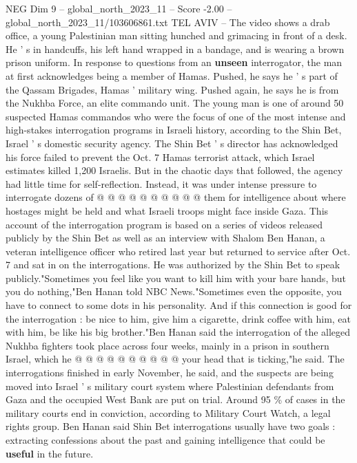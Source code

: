 \begin{textsample}{NEG Dim 9 – global\_north\_2023\_11 – Score -2.00 – global\_north\_2023\_11/103606861.txt}  \label{ex:f9_neg_302}
TEL AVIV -- The video shows a drab office, a young Palestinian man sitting hunched and grimacing in front of a desk.
He ' s in handcuffs, his left hand wrapped in a bandage, and is wearing a brown prison uniform.
In response to questions from an \textbf{unseen} interrogator, the man at first acknowledges being a member of Hamas.
Pushed, he says he ' s part of the Qassam Brigades, Hamas ' military wing.
Pushed again, he says he is from the Nukhba Force, an elite commando unit.
The young man is one of around 50 suspected Hamas commandos who were the focus of one of the most intense and high-stakes interrogation programs in Israeli history, according to the Shin Bet, Israel ' s domestic security agency.
The Shin Bet ' s director has acknowledged his force failed to prevent the Oct. 7 Hamas terrorist attack, which Israel estimates killed 1,200 Israelis.
But in the chaotic days that followed, the agency had little time for self-reflection.
Instead, it was under intense pressure to interrogate dozens of @ @ @ @ @ @ @ @ @ @ them for intelligence about where hostages might be held and what Israeli troops might face inside Gaza.
This account of the interrogation program is based on a series of videos released publicly by the Shin Bet as well as an interview with Shalom Ben Hanan, a veteran intelligence officer who retired last year but returned to service after Oct. 7 and sat in on the interrogations.
He was authorized by the Shin Bet to speak publicly."Sometimes you feel like you want to kill him with your bare hands, but you do nothing,"Ben Hanan told NBC News."Sometimes even the opposite, you have to connect to some dots in his personality.
And if this connection is good for the interrogation : be nice to him, give him a cigarette, drink coffee with him, eat with him, be like his big brother."Ben Hanan said the interrogation of the alleged Nukhba fighters took place across four weeks, mainly in a prison in southern Israel, which he @ @ @ @ @ @ @ @ @ @ your head that is ticking,"he said.
The interrogations finished in early November, he said, and the suspects are being moved into Israel ' s military court system where Palestinian defendants from Gaza and the occupied West Bank are put on trial.
Around 95 \% of cases in the military courts end in conviction, according to Military Court Watch, a legal rights group.
Ben Hanan said Shin Bet interrogations usually have two goals : extracting confessions about the past and gaining intelligence that could be \textbf{useful} in the future.

\end{textsample}
